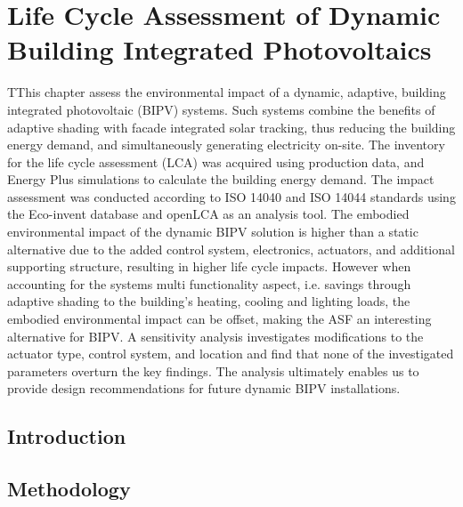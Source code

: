
\chapter{Life Cycle Assessment of Dynamic Building Integrated Photovoltaics}
\label{ch:asfLCA}

\graphicspath{{chapters/ch4LCA/Images/}}

\begin{chapterabstract}
TThis chapter assess the environmental impact of a dynamic, adaptive, building integrated photovoltaic (BIPV) systems. Such systems combine the benefits of adaptive shading with facade integrated solar tracking, thus reducing the building energy demand, and simultaneously generating electricity on-site. The inventory for the life cycle assessment (LCA) was acquired using production data, and Energy Plus simulations to calculate the building energy demand. The impact assessment was conducted according to ISO 14040 and ISO 14044 standards using the Eco-invent database and openLCA as an analysis tool. The embodied environmental impact of the dynamic BIPV solution is higher than a static alternative due to the added control system, electronics, actuators, and additional supporting structure, resulting in higher life cycle impacts. However when accounting for the systems multi functionality aspect, i.e. savings through adaptive shading to the building's heating, cooling and lighting loads, the embodied environmental impact can be offset, making the ASF an interesting alternative for BIPV. A sensitivity analysis investigates modifications to the actuator type, control system, and location and find that none of the investigated parameters overturn the key findings. The analysis ultimately enables us to provide design recommendations for future dynamic BIPV installations. 
\end{chapterabstract}


\newpage

\section{Introduction}
\label{ch:introduction4}


\section{Methodology}
\label{ch:method4}


